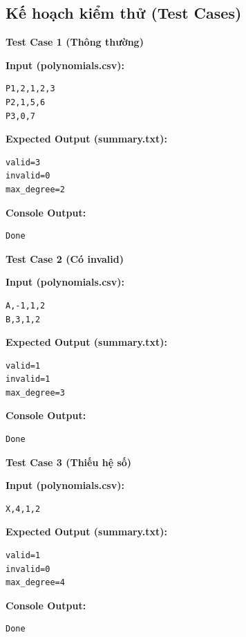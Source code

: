 \subsection{Kế hoạch kiểm thử (Test Cases)}

\textbf{Test Case 1 (Thông thường)}

\textbf{Input (polynomials.csv):}
\begin{lstlisting}
P1,2,1,2,3
P2,1,5,6
P3,0,7
\end{lstlisting}

\textbf{Expected Output (summary.txt):}
\begin{lstlisting}
valid=3
invalid=0
max_degree=2
\end{lstlisting}

\textbf{Console Output:}
\begin{lstlisting}
Done
\end{lstlisting}

\vspace{0.5cm}

\textbf{Test Case 2 (Có invalid)}

\textbf{Input (polynomials.csv):}
\begin{lstlisting}
A,-1,1,2
B,3,1,2
\end{lstlisting}

\textbf{Expected Output (summary.txt):}
\begin{lstlisting}
valid=1
invalid=1
max_degree=3
\end{lstlisting}

\textbf{Console Output:}
\begin{lstlisting}
Done
\end{lstlisting}

\vspace{0.5cm}

\textbf{Test Case 3 (Thiếu hệ số)}

\textbf{Input (polynomials.csv):}
\begin{lstlisting}
X,4,1,2
\end{lstlisting}

\textbf{Expected Output (summary.txt):}
\begin{lstlisting}
valid=1
invalid=0
max_degree=4
\end{lstlisting}

\textbf{Console Output:}
\begin{lstlisting}
Done
\end{lstlisting}